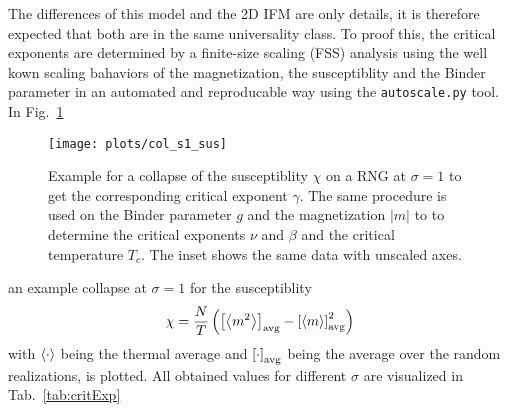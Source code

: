 The differences of this model and the 2D IFM are only details,
it is therefore expected that both are in the same universality class.
To proof this, the critical exponents are determined by a finite-size
scaling (FSS) analysis
using the well kown scaling bahaviors of the magnetization, the susceptiblity and the Binder parameter
in an automated and reproducable way using the
\texttt{autoscale.py} \cite{autoscale2009} tool.
In Fig.~\ref{fig:collapse}
\begin{figure}[htb]
    \texttt{[image: plots/col\_s1\_sus]}
    \caption[Examples of Determining Critical Temperature and Exponents]
    {
        Example for a collapse of the susceptiblity \(\chi\) on a RNG at
        \(\sigma = 1\) to get the corresponding critical exponent $\gamma$.
        The same procedure is used on the Binder parameter $g$ and the
        magnetization $|m|$ to to determine the critical exponents
        \(\nu\) and \(\beta\) and the critical temperature \(T_c\).
        The inset shows the same data with unscaled axes.
    }
    \label{fig:collapse}
\end{figure}
an example collapse at $\sigma = 1$ for the susceptiblity
\[\chi = \frac{N}{T}\left(\left[ \left< m^2 \right> \right] _{\mathrm{avg}}-\left[ \left< m \right> \right] _{\mathrm{avg}}^2\right)\]
with $\left< \cdot \right>$ being the thermal average and $\left[ \cdot \right] _{\mathrm{avg}}$ being the
average over the random realizations, is plotted.
All obtained values for different $\sigma$ are visualized in Tab.~\ref{tab:critExp}
